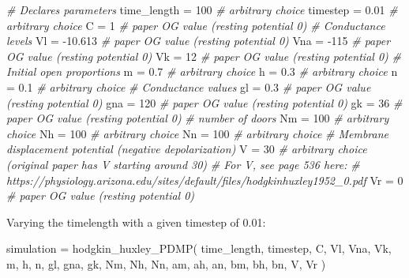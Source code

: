 \documentclass[
]{article}
\newenvironment{Shaded}{\begin{snugshade}}{\end{snugshade}}
\newcommand{\CommentTok}[1]{\textcolor[rgb]{0.56,0.35,0.01}{\textit{#1}}}
\newcommand{\DecValTok}[1]{\textcolor[rgb]{0.00,0.00,0.81}{#1}}
\newcommand{\FloatTok}[1]{\textcolor[rgb]{0.00,0.00,0.81}{#1}}
\newcommand{\FunctionTok}[1]{\textcolor[rgb]{0.00,0.00,0.00}{#1}}
\newcommand{\NormalTok}[1]{#1}
\newcommand{\OtherTok}[1]{\textcolor[rgb]{0.56,0.35,0.01}{#1}}
\newcommand{\SpecialCharTok}[1]{\textcolor[rgb]{0.00,0.00,0.00}{#1}}
\begin{document}
\begin{Shaded}
\begin{Highlighting}[]
\CommentTok{\# Declares parameters}
\NormalTok{time\_length }\OtherTok{=} \DecValTok{100}     \CommentTok{\# arbitrary choice}
\NormalTok{timestep    }\OtherTok{=} \FloatTok{0.01}    \CommentTok{\# arbitrary choice}
\NormalTok{C           }\OtherTok{=} \DecValTok{1}       \CommentTok{\# paper OG value (resting potential 0)}
\CommentTok{\# Conductance levels}
\NormalTok{Vl          }\OtherTok{=} \SpecialCharTok{{-}}\FloatTok{10.613} \CommentTok{\# paper OG value (resting potential 0)}
\NormalTok{Vna         }\OtherTok{=} \SpecialCharTok{{-}}\DecValTok{115}    \CommentTok{\# paper OG value (resting potential 0)}
\NormalTok{Vk          }\OtherTok{=} \DecValTok{12}      \CommentTok{\# paper OG value (resting potential 0)}
\CommentTok{\# Initial open proportions}
\NormalTok{m           }\OtherTok{=} \FloatTok{0.7}     \CommentTok{\# arbitrary choice}
\NormalTok{h           }\OtherTok{=} \FloatTok{0.3}     \CommentTok{\# arbitrary choice}
\NormalTok{n           }\OtherTok{=} \FloatTok{0.1}     \CommentTok{\# arbitrary choice}
\CommentTok{\# Conductance values}
\NormalTok{gl          }\OtherTok{=} \FloatTok{0.3}     \CommentTok{\# paper OG value (resting potential 0) }
\NormalTok{gna         }\OtherTok{=} \DecValTok{120}     \CommentTok{\# paper OG value (resting potential 0)}
\NormalTok{gk          }\OtherTok{=} \DecValTok{36}      \CommentTok{\# paper OG value (resting potential 0)}
\CommentTok{\# number of doors}
\NormalTok{Nm          }\OtherTok{=} \DecValTok{100}     \CommentTok{\# arbitrary choice}
\NormalTok{Nh          }\OtherTok{=} \DecValTok{100}     \CommentTok{\# arbitrary choice}
\NormalTok{Nn          }\OtherTok{=} \DecValTok{100}     \CommentTok{\# arbitrary choice}
\CommentTok{\# Membrane displacement potential (negative depolarization)}
\NormalTok{V           }\OtherTok{=} \DecValTok{30}      \CommentTok{\# arbitrary choice (original paper has V starting around 30)}
\CommentTok{\# For V, see page 536 here:}
\CommentTok{\# https://physiology.arizona.edu/sites/default/files/hodgkinhuxley1952\_0.pdf}
\NormalTok{Vr          }\OtherTok{=} \DecValTok{0}       \CommentTok{\# paper OG value (resting potential 0)}
\end{Highlighting}
\end{Shaded}

Varying the timelength with a given timestep of 0.01:

\begin{Shaded}
\begin{Highlighting}[]
\NormalTok{simulation }\OtherTok{=} \FunctionTok{hodgkin\_huxley\_PDMP}\NormalTok{(}
\NormalTok{  time\_length, timestep,}
\NormalTok{  C, }
\NormalTok{  Vl, Vna, Vk, }
\NormalTok{  m, h, n,}
\NormalTok{  gl, gna, gk,}
\NormalTok{  Nm, Nh, Nn,}
\NormalTok{  am, ah, an, bm, bh, bn,}
\NormalTok{  V, Vr}
\NormalTok{)}
\end{Highlighting}
\end{Shaded}
\end{document}
